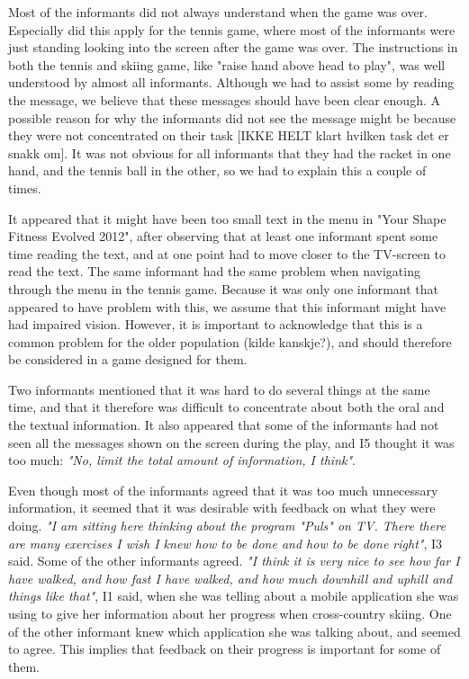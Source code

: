 Most of the informants did not always understand when the game was over. Especially did this apply for the tennis game, where most of the informants were just standing looking into the screen after the game was over.  The instructions in both the tennis and skiing game, like "raise hand above head to play", was well understood by almost all informants. Although we had to assist some by reading the message, we believe that these messages should have been clear enough. A possible reason for why the informants did not see the message might be because they were not concentrated on their task [IKKE HELT klart hvilken task det er snakk om]. It was not obvious for all informants that they had the racket in one hand, and the tennis ball in the other, so we had to explain this a couple of times. 

It appeared that it might have been too small text in the menu in "Your Shape Fitness Evolved 2012", after observing that at least one informant spent some time reading the text, and at one point had to move closer to the TV-screen to read the text. The same informant had the same problem when navigating through the menu in the tennis game. Because it was only one informant that appeared to have problem with this, we assume that this informant might have had impaired vision. However, it is important to acknowledge that this is a common problem for the older population (kilde kanskje?), and should therefore be considered in a game designed for them. 

Two informants mentioned that it was hard to do several things at the same time, and that it therefore was difficult to concentrate about both the oral and the textual information. It also appeared that some of the informants had not seen all the messages shown on the screen during the play, and I5 thought it was too much: \emph{"No, limit the total amount of information, I think"}. 

Even though most of the informants agreed that it was too much unnecessary information, it seemed that it was desirable with feedback on what they were doing. \emph{"I am sitting here thinking about the program "Puls" on TV. There there are many exercises I wish I knew how to be done and how to be done right"}, I3 said. Some of the other informants agreed. \emph{"I think it is very nice to see how far I have walked, and how fast I have walked, and how much downhill and uphill and things like that"}, I1 said, when she was telling about a mobile application she was using to give her information about her progress when cross-country skiing. One of the other informant knew which application she was talking about, and seemed to agree. This implies that feedback on their progress is important for some of them.  

